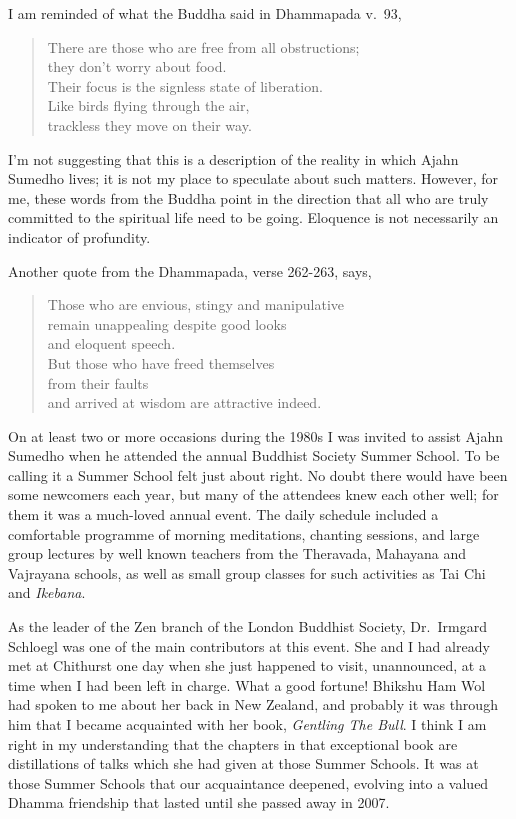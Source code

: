 I am reminded of what the Buddha said in Dhammapada v.~93,

\clearpage

\begin{quote}
  There are those who are free from all obstructions;\\
  they don't worry about food.\\
  Their focus is the signless state of liberation.\\
  Like birds flying through the air,\\
  trackless they move on their way.
\end{quote}

I'm not suggesting that this is a description of the reality in which
Ajahn Sumedho lives; it is not my place to speculate about such matters.
However, for me, these words from the Buddha point in the direction that
all who are truly committed to the spiritual life need to be going.
Eloquence is not necessarily an indicator of profundity.

Another quote from the Dhammapada, verse 262-263, says,

\begin{quote}
  Those who are envious, stingy and manipulative\\
  remain unappealing despite good looks\\
  and eloquent speech.\\
  But those who have freed themselves\\
  from their faults\\
  and arrived at wisdom are attractive indeed.
\end{quote}

On at least two or more occasions during the 1980s I was invited to
assist Ajahn Sumedho when he attended the annual Buddhist Society Summer
School\cite{summer}.
To be calling it a Summer School felt just about right.
No doubt there would have been some newcomers each year, but many of the
attendees knew each other well; for them it was a much-loved annual
event. The daily schedule included a comfortable programme of morning
meditations, chanting sessions, and large group lectures by well known
teachers from the Theravada, Mahayana and Vajrayana schools, as well as
small group classes for such activities as Tai Chi and \emph{Ikebana}\cite{ikebana}.

As the leader of the Zen branch of the London Buddhist Society, Dr.~Irmgard Schloegl\cite{irmgard}
was one of the main contributors at this event. She
and I had already met at Chithurst one day when she just happened to
visit, unannounced, at a time when I had been left in charge. What a
good fortune! Bhikshu Ham Wol had spoken to me about her back in New
Zealand, and probably it was through him that I became acquainted with
her book, \emph{Gentling The Bull}\cite{bull}.
I think I am right in my understanding that the
chapters in that exceptional book are distillations of talks which she
had given at those Summer Schools. It was at those Summer Schools that
our acquaintance deepened, evolving into a valued Dhamma friendship that
lasted until she passed away in 2007.

